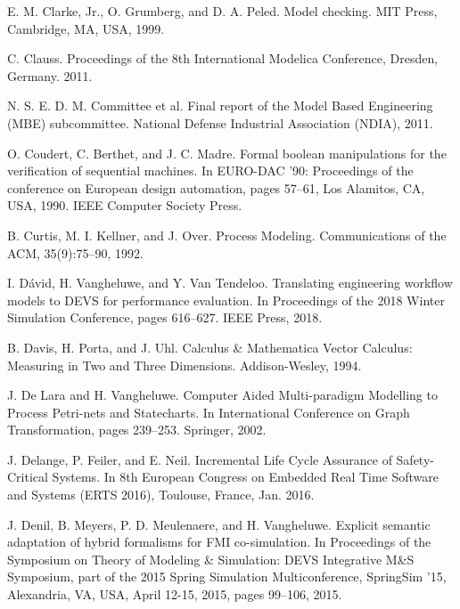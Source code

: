 \begin{description}[style=nextline,leftmargin=12mm,labelwidth=10mm,font=\normalfont]
\item[{[74]}] E. M. Clarke, Jr., O. Grumberg, and D. A. Peled. Model checking. MIT Press, Cambridge, MA, USA, 1999.

\item[{[75]}] C. Clauss. Proceedings of the 8th International Modelica Conference, Dresden, Germany. 2011.

\item[{[76]}] N. S. E. D. M. Committee et al. Final report of the Model Based Engineering (MBE) subcommittee. National Defense Industrial Association (NDIA), 2011.

\item[{[77]}] O. Coudert, C. Berthet, and J. C. Madre. Formal boolean manipulations for the verification of sequential machines. In EURO-DAC ’90: Proceedings of the conference on European design automation, pages 57–61, Los Alamitos, CA, USA, 1990. IEEE Computer Society Press.

\item[{[78]}] B. Curtis, M. I. Kellner, and J. Over. Process Modeling. Communications of the ACM, 35(9):75–90, 1992.

\item[{[79]}] I. Dávid, H. Vangheluwe, and Y. Van Tendeloo. Translating engineering workflow models to DEVS for performance evaluation. In Proceedings of the 2018 Winter Simulation Conference, pages 616–627. IEEE Press, 2018.

\item[{[80]}] B. Davis, H. Porta, and J. Uhl. Calculus \& Mathematica Vector Calculus: Measuring in Two and Three Dimensions. Addison-Wesley, 1994.

\item[{[81]}] J. De Lara and H. Vangheluwe. Computer Aided Multi-paradigm Modelling to Process Petri-nets and Statecharts. In International Conference on Graph Transformation, pages 239–253. Springer, 2002.

\item[{[82]}] J. Delange, P. Feiler, and E. Neil. Incremental Life Cycle Assurance of Safety-Critical Systems. In 8th European Congress on Embedded Real Time Software and Systems (ERTS 2016), Toulouse, France, Jan. 2016.

\item[{[83]}] J. Denil, B. Meyers, P. D. Meulenaere, and H. Vangheluwe. Explicit semantic adaptation of hybrid formalisms for FMI co-simulation. In Proceedings of the Symposium on Theory of Modeling \& Simulation: DEVS Integrative M\&S Symposium, part of the 2015 Spring Simulation Multiconference, SpringSim ’15, Alexandria, VA, USA, April 12-15, 2015, pages 99–106, 2015.


\end{description}
